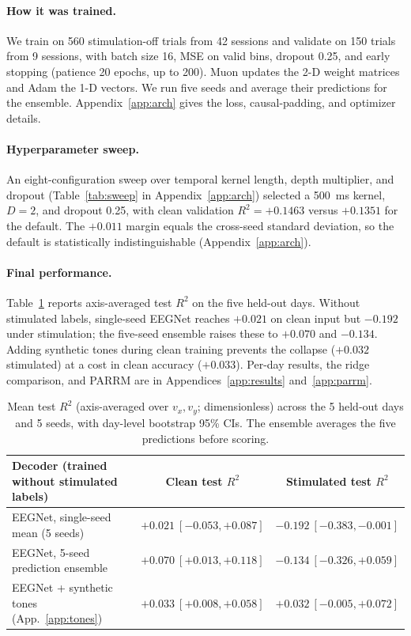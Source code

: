 \documentclass{article}
\begin{document}
\paragraph{How it was trained.}
We train on 560 stimulation-off trials from 42 sessions and validate on 150 trials from 9 sessions, with batch size 16, MSE on valid bins, dropout 0.25, and early stopping (patience 20 epochs, up to 200). Muon updates the 2-D weight matrices and Adam the 1-D vectors. We run five seeds and average their predictions for the ensemble. Appendix~\ref{app:arch} gives the loss, causal-padding, and optimizer details.

\paragraph{Hyperparameter sweep.}
An eight-configuration sweep over temporal kernel length, depth multiplier, and dropout (Table~\ref{tab:sweep} in Appendix~\ref{app:arch}) selected a 500~ms kernel, $D=2$, and dropout 0.25, with clean validation $R^2=+0.1463$ versus $+0.1351$ for the default. The $+0.011$ margin equals the cross-seed standard deviation, so the default is statistically indistinguishable (Appendix~\ref{app:arch}).

\paragraph{Final performance.}
Table~\ref{tab:main} reports axis-averaged test $R^2$ on the five held-out days. Without stimulated labels, single-seed EEGNet reaches $+0.021$ on clean input but $-0.192$ under stimulation; the five-seed ensemble raises these to $+0.070$ and $-0.134$. Adding synthetic tones during clean training prevents the collapse ($+0.032$ stimulated) at a cost in clean accuracy ($+0.033$). Per-day results, the ridge comparison, and PARRM are in Appendices~\ref{app:results} and~\ref{app:parrm}.

\begin{table}[htbp]\centering
\caption{Mean test $R^2$ (axis-averaged over $v_x,v_y$; dimensionless) across the 5 held-out days and 5 seeds, with day-level bootstrap 95\% CIs. The ensemble averages the five predictions before scoring.}
\small
\begin{tabular}{@{}lcc@{}}\toprule
Decoder (trained without stimulated labels) & Clean test $R^2$ & Stimulated test $R^2$ \\ \midrule
EEGNet, single-seed mean (5 seeds) & $+0.021\ [-0.053,+0.087]$ & $-0.192\ [-0.383,-0.001]$ \\
EEGNet, 5-seed prediction ensemble & $+0.070\ [+0.013,+0.118]$ & $-0.134\ [-0.326,+0.059]$ \\
EEGNet + synthetic tones (App.~\ref{app:tones}) & $+0.033\ [+0.008,+0.058]$ & $+0.032\ [-0.005,+0.072]$ \\
\bottomrule\end{tabular}\label{tab:main}
\end{table}
\end{document}
